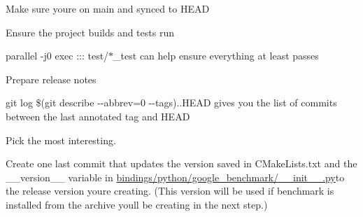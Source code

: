 
\begin{DoxyItemize}
\item Make sure you\textquotesingle{}re on main and synced to HEAD
\item Ensure the project builds and tests run
\begin{DoxyItemize}
\item {\ttfamily parallel -\/j0 exec \+::\+: test/$\ast$\+\_\+test} can help ensure everything at least passes
\end{DoxyItemize}
\item Prepare release notes
\begin{DoxyItemize}
\item {\ttfamily git log \$(git describe -\/-\/abbrev=0 -\/-\/tags)..HEAD} gives you the list of commits between the last annotated tag and HEAD
\item Pick the most interesting.
\end{DoxyItemize}
\item Create one last commit that updates the version saved in {\ttfamily CMake\+Lists.\+txt} and the {\ttfamily \+\_\+\+\_\+version\+\_\+\+\_\+} variable in {\ttfamily \mbox{\hyperlink{bindings_2python_2google__benchmark_2____init_____8py}{bindings/python/google\+\_\+benchmark/\+\_\+\+\_\+init\+\_\+\+\_\+.\+py}}}to the release version you\textquotesingle{}re creating. (This version will be used if benchmark is installed from the archive you\textquotesingle{}ll be creating in the next step.)
\end{DoxyItemize}


\begin{DoxyCode}{0}

\end{DoxyCode}



\begin{DoxyCode}{0}
\DoxyCodeLine{}
\DoxyCodeLine{}
\DoxyCodeLine{}

\end{DoxyCode}



